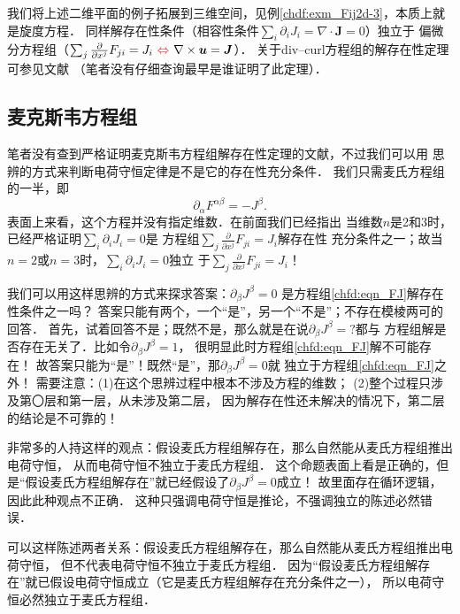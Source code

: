 我们将上述二维平面的例子拓展到三维空间，见例\ref{chdf:exm_Fij2d-3}，本质上就是旋度方程．
同样解存在性条件（相容性条件$\sum_{i} \partial_i J_i =\nabla \cdot \boldsymbol{J}= 0 $）独立于
偏微分方程组（$\sum_{j}\frac{\partial}{\partial x^j} F_{ji} = J_{i} {\ \color{red}\Leftrightarrow \ }
\nabla\times \boldsymbol{u} = \boldsymbol{J} $）．
关于div--curl方程组的解存在性定理可参见文献\parencite{aramaki-2014}
（笔者没有仔细查询最早是谁证明了此定理）．


\subsection{麦克斯韦方程组}
笔者没有查到严格证明麦克斯韦方程组解存在性定理的文献，不过我们可以用
思辨的方式来判断电荷守恒定律是不是它的存在性充分条件．
我们只需麦氏方程组的一半，即
\begin{equation}\label{chfd:eqn_FJ}
    \partial_{\alpha} F^{\alpha\beta} = - J^{\beta} .
\end{equation}
表面上来看，这个方程并没有指定维数．在前面我们已经指出
当维数$n$是2和3时，已经严格证明$\sum_{i} \partial_i J_i =0$是
方程组$\sum_{j}\frac{\partial}{\partial x^j} F_{ji} = J_{i}$解存在性
充分条件之一；故当$n=2$或$n=3$时，$\sum_{i} \partial_i J_i =0$独立
于$\sum_{j}\frac{\partial}{\partial x^j} F_{ji} = J_{i}$！

我们可以用这样思辨的方式来探求答案：$\partial_{\beta} J^{\beta}=0$
是方程组\eqref{chfd:eqn_FJ}解存在性条件之一吗？
答案只能有两个，一个“是”，另一个“不是”；不存在模棱两可的回答．
首先，试着回答不是；既然不是，那么就是在说$\partial_{\beta} J^{\beta}=?$都与
方程组解是否存在无关了．比如令$\partial_{\beta} J^{\beta}=1$，
很明显此时方程组\eqref{chfd:eqn_FJ}解不可能存在！
故答案只能为“是”！既然“是”，那$\partial_{\beta} J^{\beta}=0$就
独立于方程组\eqref{chfd:eqn_FJ}之外！
需要注意：(1)在这个思辨过程中根本不涉及方程的维数；
(2)整个过程只涉及第〇层和第一层，从未涉及第二层，
因为解存在性还未解决的情况下，第二层的结论是不可靠的！


非常多的人持这样的观点：假设麦氏方程组解存在，那么自然能从麦氏方程组推出电荷守恒，
从而电荷守恒不独立于麦氏方程组．
这个命题表面上看是正确的，但是“假设麦氏方程组解存在”就已经假设了$\partial_{\beta} J^{\beta}=0$成立！
故里面存在循环逻辑，因此此种观点不正确．
这种只强调电荷守恒是推论，不强调独立的陈述必然错误．



可以这样陈述两者关系：假设麦氏方程组解存在，那么自然能从麦氏方程组推出电荷守恒，
但不代表电荷守恒不独立于麦氏方程组．
因为“假设麦氏方程组解存在”就已假设电荷守恒成立（它是麦氏方程组解存在充分条件之一），
所以电荷守恒必然独立于麦氏方程组．

